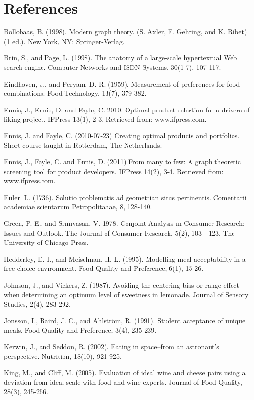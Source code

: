 \newpage\section{References}

\noindent
Bollobaas, B. (1998). Modern graph theory. (S. Axler, F. Gehring, and K. Ribet) (1 ed.). New York, NY: Springer-Verlag.

\noindent
Brin, S., and Page, L. (1998). The anatomy of a large-scale hypertextual Web search engine. Computer Networks and ISDN Systems, 30(1-7), 107-117.

\noindent
Eindhoven, J., and Peryam, D. R. (1959). Measurement of preferences for food combinations. Food Technology, 13(7), 379-382.

\noindent
Ennis, J., Ennis, D. and Fayle, C. 2010. Optimal product selection for a drivers of liking project. IFPress 13(1), 2-3. Retrieved from: www.ifpress.com.

\noindent
Ennis, J. and Fayle, C. (2010-07-23) Creating optimal products and portfolios. Short course taught in Rotterdam, The Netherlands.

\noindent
Ennis, J., Fayle, C. and Ennis, D. (2011) From many to few: A graph theoretic screening tool for product developers. IFPress 14(2), 3-4. Retrieved from: www.ifpress.com.

\noindent
Euler, L. (1736). Solutio problematis ad geometrian situs pertinentis. Comentarii academiae scientarum Petropolitanae, 8, 128-140.

\noindent
Green, P. E., and Srinivasan, V. 1978. Conjoint Analysis in Consumer Research: Issues and Outlook. The Journal of Consumer Research, 5(2), 103 - 123. The University of Chicago Press.

\noindent
Hedderley, D. I., and Meiselman, H. L. (1995). Modelling meal acceptability in a free choice environment. Food Quality and Preference, 6(1), 15-26.

\noindent
Johnson, J., and Vickers, Z. (1987). Avoiding the centering bias or range effect when determining an optimum level of sweetness in lemonade. Journal of Sensory Studies, 2(4), 283-292.

\noindent
Jonsson, I., Baird, J. C., and Ahlström, R. (1991). Student acceptance of unique meals. Food Quality and Preference, 3(4), 235-239.

\noindent
Kerwin, J., and Seddon, R. (2002). Eating in space--from an astronaut's perspective. Nutrition, 18(10), 921-925.

\noindent
King, M., and Cliff, M. (2005). Evaluation of ideal wine and cheese pairs using a deviation-from-ideal scale with food and wine experts. Journal of Food Quality, 28(3), 245-256.

